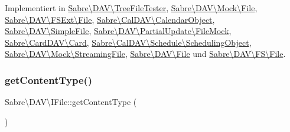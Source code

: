 Implementiert in \mbox{\hyperlink{class_sabre_1_1_d_a_v_1_1_tree_file_tester_a38879bb7792e5e5d2413aa142a46b466}{Sabre\textbackslash{}\+D\+A\+V\textbackslash{}\+Tree\+File\+Tester}}, \mbox{\hyperlink{class_sabre_1_1_d_a_v_1_1_mock_1_1_file_a680bfbc05027d3b00e3dc7198e6d4172}{Sabre\textbackslash{}\+D\+A\+V\textbackslash{}\+Mock\textbackslash{}\+File}}, \mbox{\hyperlink{class_sabre_1_1_d_a_v_1_1_f_s_ext_1_1_file_a80f50ccff4fdf801c1a531ec4c62975f}{Sabre\textbackslash{}\+D\+A\+V\textbackslash{}\+F\+S\+Ext\textbackslash{}\+File}}, \mbox{\hyperlink{class_sabre_1_1_cal_d_a_v_1_1_calendar_object_adef5802dc47306abb1e00a18a63ca7eb}{Sabre\textbackslash{}\+Cal\+D\+A\+V\textbackslash{}\+Calendar\+Object}}, \mbox{\hyperlink{class_sabre_1_1_d_a_v_1_1_simple_file_afe23fefcf079b4fe34f2e612be324e3b}{Sabre\textbackslash{}\+D\+A\+V\textbackslash{}\+Simple\+File}}, \mbox{\hyperlink{class_sabre_1_1_d_a_v_1_1_partial_update_1_1_file_mock_aea1fec1a2850e1508a2f02a04a8ed7e8}{Sabre\textbackslash{}\+D\+A\+V\textbackslash{}\+Partial\+Update\textbackslash{}\+File\+Mock}}, \mbox{\hyperlink{class_sabre_1_1_card_d_a_v_1_1_card_ab134afaa3e735b4af870f7dead651184}{Sabre\textbackslash{}\+Card\+D\+A\+V\textbackslash{}\+Card}}, \mbox{\hyperlink{class_sabre_1_1_cal_d_a_v_1_1_schedule_1_1_scheduling_object_a98094b6dd7d1113b10f2b492e956d6e7}{Sabre\textbackslash{}\+Cal\+D\+A\+V\textbackslash{}\+Schedule\textbackslash{}\+Scheduling\+Object}}, \mbox{\hyperlink{class_sabre_1_1_d_a_v_1_1_mock_1_1_streaming_file_a4492beb835030b97e2bc3e6c4d2cdf4d}{Sabre\textbackslash{}\+D\+A\+V\textbackslash{}\+Mock\textbackslash{}\+Streaming\+File}}, \mbox{\hyperlink{class_sabre_1_1_d_a_v_1_1_file_a0879cd6cff2723f41eb31dae59bc63d0}{Sabre\textbackslash{}\+D\+A\+V\textbackslash{}\+File}} und \mbox{\hyperlink{class_sabre_1_1_d_a_v_1_1_f_s_1_1_file_aee10f79224dfccf81bf9ca61e3cfba43}{Sabre\textbackslash{}\+D\+A\+V\textbackslash{}\+F\+S\textbackslash{}\+File}}.

\mbox{\label{interface_sabre_1_1_d_a_v_1_1_i_file_aa76147e3e0ad228026dcb03035b499bc}} 
\subsubsection{\texorpdfstring{get\+Content\+Type()}{getContentType()}}
{\footnotesize\ttfamily Sabre\textbackslash{}\+D\+A\+V\textbackslash{}\+I\+File\+::get\+Content\+Type (\begin{DoxyParamCaption}{ }\end{DoxyParamCaption})}

